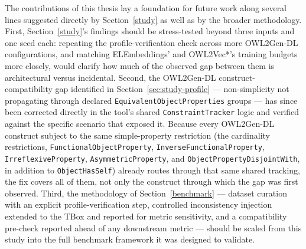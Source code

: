 The contributions of this thesis lay a foundation for future work along several lines suggested directly by Section~\ref{study} as well as by the broader methodology. First, Section~\ref{study}'s findings should be stress-tested beyond three inputs and one seed each: repeating the profile-verification check across more OWL2Gen-DL configurations, and matching ELEmbeddings' and OWL2Vec*'s training budgets more closely, would clarify how much of the observed gap between them is architectural versus incidental. Second, the OWL2Gen-DL construct-compatibility gap identified in Section~\ref{sec:study-profile} — non-simplicity not propagating through declared \texttt{EquivalentObjectProperties} groups — has since been corrected directly in the tool's shared \texttt{ConstraintTracker} logic and verified against the specific scenario that exposed it. Because every OWL2Gen-DL construct subject to the same simple-property restriction (the cardinality restrictions, \texttt{FunctionalObjectProperty}, \texttt{InverseFunctionalProperty}, \texttt{IrreflexiveProperty}, \texttt{AsymmetricProperty}, and \texttt{ObjectPropertyDisjointWith}, in addition to \texttt{ObjectHasSelf}) already routes through that same shared tracking, the fix covers all of them, not only the construct through which the gap was first observed. Third, the methodology of Section~\ref{benchmark} — dataset curation with an explicit profile-verification step, controlled inconsistency injection extended to the TBox and reported for metric sensitivity, and a compatibility pre-check reported ahead of any downstream metric — should be scaled from this study into the full benchmark framework it was designed to validate.
